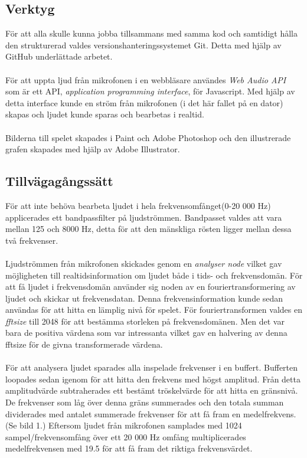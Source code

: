 \documentclass[12pt, titlepage, a4paper]{article}
\begin{document}
		\subsection{Verktyg}
			För att alla skulle kunna jobba tillsammans med samma kod och samtidigt hålla den strukturerad valdes versionshanteringssystemet Git. Detta med hjälp av GitHub underlättade arbetet.
			\\ \\
			För att uppta ljud från mikrofonen i en webbläsare användes \textit{Web Audio API}\cite{MDN} som är ett API, \textit{application programming interface}, för Javascript. Med hjälp av detta interface kunde en ström från mikrofonen (i det här fallet på en dator) skapas och ljudet kunde sparas och bearbetas i realtid.
			\\ \\
			Bilderna till spelet skapades i Paint och Adobe Photoshop och den illustrerade grafen skapades med hjälp av Adobe Illustrator.

		\subsection{Tillvägagångssätt}
			För att inte behöva bearbeta ljudet i hela frekvensomfånget(0-20 000 Hz) applicerades ett bandpassfilter på ljudströmmen. Bandpasset valdes att vara mellan 125 och 8000 Hz, detta för att den mänskliga rösten ligger mellan dessa två frekvenser\cite{freq}.
			\\ \\
			Ljudströmmen från mikrofonen skickades genom en \textit{analyser node} vilket gav möjligheten till realtidsinformation om ljudet både i tids- och frekvensdomän. För att få ljudet i frekvensdomän använder sig noden av en fouriertransformering av ljudet och skickar ut frekvensdatan. Denna frekvensinformation kunde sedan användas för att hitta en lämplig nivå för spelet. För fouriertransformen valdes en \textit{fftsize} till 2048 för att bestämma storleken på frekvensdomänen. Men det var bara de positiva värdena som var intressanta vilket gav en halvering av denna fftsize för de givna transformerade värdena\cite{AnalyserNode}.
			\\ \\
			För att analysera ljudet sparades alla inspelade frekvenser i en buffert. Bufferten loopades sedan igenom för att hitta den frekvens med högst amplitud. Från detta amplitudvärde subtraherades ett bestämt tröskelvärde för att hitta en gränsnivå. De frekvenser som låg över denna gräns summerades och den totala summan dividerades med antalet summerade frekvenser för att få fram en medelfrekvens. (Se bild 1.) Eftersom ljudet från mikrofonen samplades med 1024 sampel/frekvensomfång över ett 20 000 Hz omfång multiplicerades medelfrekvensen med 19.5 för att få fram det riktiga frekvensvärdet.
\end{document}
